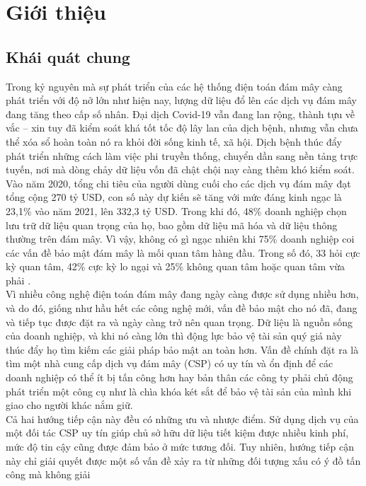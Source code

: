 \chapter{Giới thiệu}
\section{Khái quát chung}

Trong kỷ nguyên mà sự phát triển của các hệ thống điện toán đám mây càng phát
triển với độ nở lớn như hiện nay, lượng dữ liệu đổ lên các dịch vụ đám mây đang tăng
theo cấp số nhân. Đại dịch Covid-19 vẫn đang lan rộng, thành tựu về vắc – xin tuy đã
kiểm soát khá tốt tốc độ lây lan của dịch bệnh, nhưng vẫn chưa thể xóa sổ hoàn toàn nó
ra khỏi đời sống kinh tế, xã hội. Dịch bệnh thúc đẩy phát triển những cách làm việc phi
truyền thống, chuyển dần sang nền tảng trực tuyến, nơi mà dòng chảy dữ liệu vốn đã
chật chội nay càng thêm khó kiểm soát. Vào năm 2020, tổng chi tiêu của người dùng
cuối cho các dịch vụ đám mây đạt tổng cộng 270 tỷ USD, con số này dự kiến sẽ tăng với
mức đáng kinh ngạc là 23,1\% vào năm 2021, lên 332,3 tỷ USD. Trong khi đó, 48\%
doanh nghiệp chọn lưu trữ dữ liệu quan trọng của họ, bao gồm dữ liệu mã hóa và dữ liệu
thông thường trên đám mây. Vì vậy, không có gì ngạc nhiên khi 75\% doanh nghiệp coi
các vấn đề bảo mật đám mây là mối quan tâm hàng đầu. Trong số đó, 33%
hỏi cực kỳ quan tâm, 42\% cực kỳ lo ngại và 25\% không quan tâm hoặc quan tâm vừa
phải \cite{vladimir2021cloudcomputing}. \\
\indent Vì nhiều công nghệ điện toán đám mây đang ngày càng được sử dụng nhiều hơn,
và do đó, giống như hầu hết các công nghệ mới, vấn đề bảo mật cho nó đã, đang và tiếp
tục được đặt ra và ngày càng trở nên quan trọng. Dữ liệu là nguồn sống của doanh nghiệp,
và khi nó càng lớn thì động lực bảo vệ tài sản quý giá này thúc đẩy họ tìm kiếm các giải
pháp bảo mật an toàn hơn. Vấn đề chính đặt ra là tìm một nhà cung cấp dịch vụ đám mây
(CSP) có uy tín và ổn định để các doanh nghiệp có thể ít bị tấn công hơn hay bản thân
các công ty phải chủ động phát triển một công cụ như là chìa khóa két sắt để bảo vệ tài
sản của mình khi giao cho người khác nắm giữ. \\
\indent Cả hai hướng tiếp cận này đều có những ưu và nhược điểm. Sử dụng dịch vụ của
một đối tác CSP uy tín giúp chủ sở hữu dữ liệu tiết kiệm được nhiều kinh phí, mức độ
tin cậy cũng được đảm bảo ở mức tương đối. Tuy nhiên, hướng tiếp cận này chỉ giải quyết được một số vấn đề xảy ra từ những đối tượng xấu có ý đồ tấn công mà không giải
